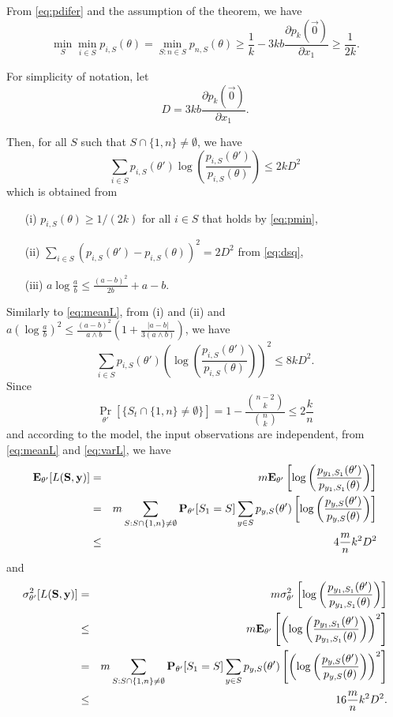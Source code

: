 From \eqref{eq:pdifer} and the assumption of the theorem, we have
\begin{equation}
\min_{S}\min_{i\in S} p_{i,S}(\theta) = \min_{S: n\in S} p_{n,S}(\theta)
\ge \frac{1}{k} - 3kb \frac{\partial p_k (\vec{0})}{\partial x_1}
\ge \frac{1}{2k}.
\label{eq:pmin}
\end{equation}

For simplicity of notation, let
\begin{equation}
D = 3kb \frac{\partial p_k (\vec{0})}{\partial x_1}.
\end{equation}

Then, for all $S$ such that $S\cap \{1,n\} \neq \emptyset$, we have
\begin{equation}
\sum_{i\in S} p_{i,S}(\theta') \log\left(\frac{p_{i,S}(\theta')}{p_{i,S}(\theta)}\right) \le 2 k D^2
\label{eq:meanL}
\end{equation}
which is obtained from 
\begin{itemize}
\item[(i)] $p_{i,S}(\theta) \ge 1/(2k)$ for all $i\in S$ that holds by \eqref{eq:pmin},
\item[(ii)] $\sum_{i\in S}(p_{i,S}(\theta')-p_{i,S}(\theta))^2 = 2D^2$ from \eqref{eq:dsq}, 
\item[(iii)] 
$a\log\frac{a}{b} \le \frac{(a-b)^2}{2b}+a-b$. 
\end{itemize}
Similarly to \eqref{eq:meanL}, from (i) and (ii) and $a\left(\log\frac{a}{b}\right)^2 \le \frac{(a-b)^2}{a \wedge b}\left(1+\frac{|a-b|}{3(a\wedge b)}\right) $, we have
\begin{equation}
\sum_{i\in S} p_{i,S}(\theta')\left(\log\left(\frac{p_{i,S}(\theta')}{p_{i,S}(\theta)}\right)\right)^2 \le 8k D^2.
\label{eq:varL}
\end{equation}
Since 
$$
\Pr_{\theta'}[\{S_t\cap \{1,n \}\neq \emptyset\}] = 1- \frac{{n-2 \choose k}}{{n \choose k}} \le 2\frac{k}{n}
$$ 
and according to the model, the input observations are independent, from \eqref{eq:meanL} and \eqref{eq:varL}, we have
\begin{eqnarray}
\mathbf{E}_{\theta'}[L(\mathbf{S},\mathbf{y})] 
&=&  m \mathbf{E}_{\theta'}\left[\log\left(\frac{p_{y_1,S_1}(\theta')}{p_{y_1,S_1}(\theta)}\right) \right] \cr
&= & m\sum_{S: S\cap\{1,n\}\neq \emptyset} \mathbf{P}_{\theta'}[S_1 = S] \sum_{y\in S}p_{y,S}(\theta')\left[\log\left(\frac{p_{y,S}(\theta')}{p_{y,S}(\theta)}\right) \right] \cr
&\le& 4\frac{m}{n}k^2 D^2
\end{eqnarray}
and
\begin{eqnarray}
\sigma^2_{\theta'}[L(\mathbf{S},\mathbf{y})]
&= & m \sigma^2_{\theta'}\left[\log\left(\frac{p_{y_1,S_1}(\theta')}{p_{y_1,S_1}(\theta)}\right) \right] \cr
&\le & m \mathbf{E}_{\theta'}\left[\left(\log\left(\frac{p_{y_1,S_1}(\theta')}{p_{y_1,S_1}(\theta)}\right)\right)^2 \right] \cr
&= & m\sum_{S: S\cap\{1,n\}\neq \emptyset} \mathbf{P}_{\theta'}[S_1 = S]\sum_{y\in S}p_{y,S}(\theta')\left[\left(\log\left(\frac{p_{y,S}(\theta')}{p_{y,S}(\theta)}\right)\right)^2 \right] \cr
&\le & 16\frac{m}{n}k^2 D^2.
\end{eqnarray}

